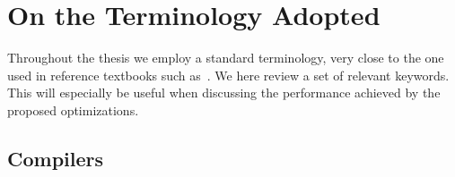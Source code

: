 \section{On the Terminology Adopted}
\label{sec:bkg:terminology}
Throughout the thesis we employ a standard terminology, very close to the one used in reference textbooks such as~\cite{patterson-book}. We here review a set of relevant keywords. This will especially be useful when discussing the performance achieved by the proposed optimizations.



\subsection*{Compilers}

